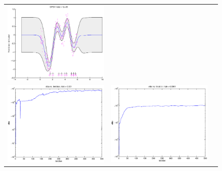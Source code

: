 \documentclass{article} %
\begin{document}
\begin{figure}
\begin{tabular}{ccc}
\includegraphics[scale=0.3]{figures/func1-svi-lrate1e-05.eps} \\
\includegraphics[scale=0.3]{figures/func1-svi-lrate1e-03-bound.eps} &
\includegraphics[scale=0.3]{figures/func1-svi-lrate1e-04-bound.eps} &

\end{tabular}
\end{figure}
\end{document}
